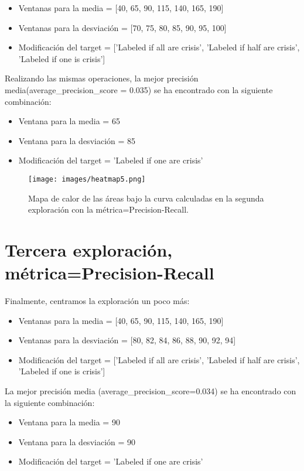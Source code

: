 \documentclass[a4paper,12pt,twoside,oldfontcommands]{memoir}
\begin{document}
\begin{itemize}
    \item Ventanas para la media = [40, 65, 90, 115, 140, 165, 190]
    \item Ventanas para la desviación = [70, 75, 80, 85, 90, 95, 100]
    \item Modificación del target = ['Labeled if all are crisis', 'Labeled if half are crisis', 'Labeled if one is crisis']
\end{itemize}

Realizando las mismas operaciones, la mejor precisión media(average\_precision\_score = 0.035) se ha encontrado con la siguiente combinación: 
\begin{itemize}
    \item Ventana para la media = 65
    \item Ventana para la desviación = 85
    \item Modificación del target = 'Labeled if one are crisis'
\end{itemize}

\begin{figure}
    \centering
    \texttt{[image: images/heatmap5.png]}
    \caption{Mapa de calor de las áreas bajo la curva calculadas en la segunda exploración con la métrica=Precision-Recall.}
    \label{fig:heatmap5}
\end{figure}

\section{Tercera exploración, métrica=Precision-Recall}
Finalmente, centramos la exploración un poco más: 
\begin{itemize}
    \item Ventanas para la media = [40, 65, 90, 115, 140, 165, 190]
    \item Ventanas para la desviación = [80, 82, 84, 86, 88, 90, 92, 94]
    \item Modificación del target = ['Labeled if all are crisis', 'Labeled if half are crisis', 'Labeled if one is crisis']
\end{itemize}

La mejor precisión media (average\_precision\_score=0.034) se ha encontrado con la siguiente combinación: 
\begin{itemize}
    \item Ventana para la media = 90
    \item Ventana para la desviación = 90
    \item Modificación del target = 'Labeled if one are crisis'
\end{itemize}
\end{document}
